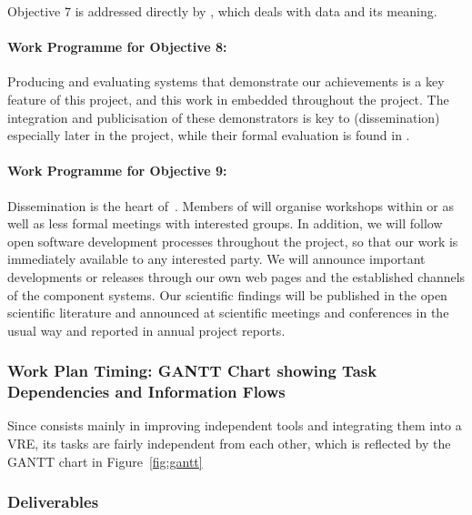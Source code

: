 \documentclass[noworkareas,deliverables,\classoptions]{euproposal}       %
\begin{document}
\begin{proposal}
Objective 7 is addressed directly by , which deals with data
and its meaning.

\paragraph{Work Programme for Objective 8: }

Producing and evaluating systems that demonstrate our achievements is
a key feature of this project, and this work in embedded throughout
the project. The integration and publicisation of these demonstrators
is key to  (dissemination) especially later in the
project, while their formal evaluation is found in .

\paragraph{Work Programme for Objective 9: }

Dissemination is the heart of~.
Members of \TheProject will organise workshops within 
or  as well as less formal meetings
with interested groups. In addition, we will follow open software development
processes throughout the project, so that our work is immediately
available to any interested party. We will announce important
developments or releases through our own web pages and the
established channels of the component systems. Our scientific findings
will be published in the open scientific literature and announced at
scientific meetings and conferences in the usual way and reported in
annual project reports.


\subsubsection{Work Plan Timing: GANTT Chart showing Task Dependencies and Information
  Flows}

Since \TheProject consists mainly in improving independent tools and
integrating them into a VRE, its tasks are fairly independent from each
other, which is reflected by the GANTT chart in Figure~\ref{fig:gantt}

\gantttaskchart[draft,xscale=.33,yscale=.33,milestones]

\ifgrantagreement\else
\newpage
\subsubsection{Deliverables}\label{sec:deliverables}
\fi


\end{proposal}
\end{document}
